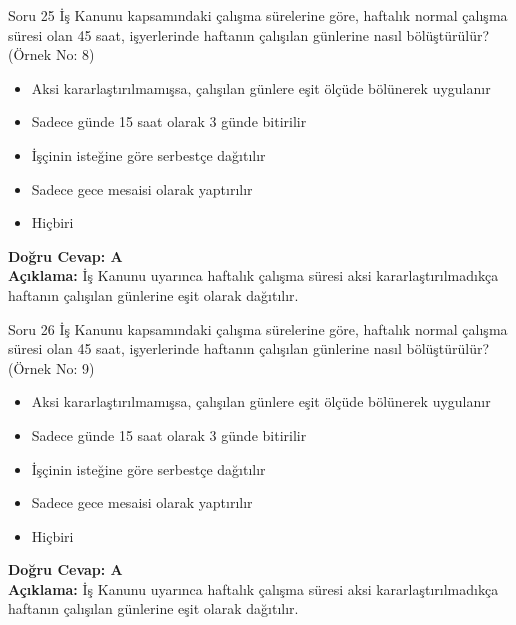\documentclass[12pt,a4paper]{article}
\begin{document}
\begin{testcard}{Soru 25}
    İş Kanunu kapsamındaki çalışma sürelerine göre, haftalık normal çalışma süresi olan 45 saat, işyerlerinde haftanın çalışılan günlerine nasıl bölüştürülür? (Örnek No: 8)
    \begin{itemize}
        \item[A)] Aksi kararlaştırılmamışsa, çalışılan günlere eşit ölçüde bölünerek uygulanır
        \item[B)] Sadece günde 15 saat olarak 3 günde bitirilir
        \item[C)] İşçinin isteğine göre serbestçe dağıtılır
        \item[D)] Sadece gece mesaisi olarak yaptırılır
        \item[E)] Hiçbiri
    \end{itemize}
    \tcblower
    \textbf{Doğru Cevap: A} \\
    \textbf{Açıklama:} İş Kanunu uyarınca haftalık çalışma süresi aksi kararlaştırılmadıkça haftanın çalışılan günlerine eşit olarak dağıtılır.
\end{testcard}

\begin{testcard}{Soru 26}
    İş Kanunu kapsamındaki çalışma sürelerine göre, haftalık normal çalışma süresi olan 45 saat, işyerlerinde haftanın çalışılan günlerine nasıl bölüştürülür? (Örnek No: 9)
    \begin{itemize}
        \item[A)] Aksi kararlaştırılmamışsa, çalışılan günlere eşit ölçüde bölünerek uygulanır
        \item[B)] Sadece günde 15 saat olarak 3 günde bitirilir
        \item[C)] İşçinin isteğine göre serbestçe dağıtılır
        \item[D)] Sadece gece mesaisi olarak yaptırılır
        \item[E)] Hiçbiri
    \end{itemize}
    \tcblower
    \textbf{Doğru Cevap: A} \\
    \textbf{Açıklama:} İş Kanunu uyarınca haftalık çalışma süresi aksi kararlaştırılmadıkça haftanın çalışılan günlerine eşit olarak dağıtılır.
\end{testcard}
\end{document}
